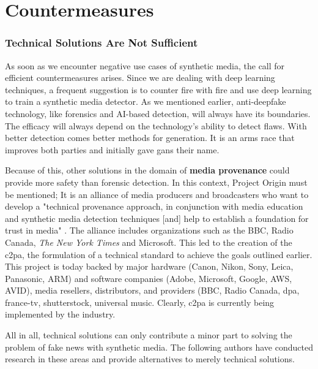 \documentclass[
  a4paper,  %
  twoside,  %
  bibliography=totoc,
  headsepline,
  cleardoublepage=empty,
  parskip=half,
  draft=false
]{scrbook}
\begin{document}
\section{Countermeasures}
\label{sec:rel-work-counteringdf}
\subsubsection*{Technical Solutions Are Not Sufficient}
As soon as we encounter negative use cases of synthetic media, the call for efficient countermeasures arises. Since we are dealing with deep learning techniques, a frequent suggestion is to counter fire with fire and use deep learning to train a synthetic media detector. As we mentioned earlier, anti-deepfake technology, like forensics and AI-based detection, will always have its boundaries. The efficacy will always depend on the technology's ability to detect flaws. With better detection comes better methods for generation. It is an arms race that improves both parties and initially gave \gls{gan}s their name.

Because of this, other solutions in the domain of \textbf{media provenance} could provide more safety than forensic detection. In this context, Project Origin must be mentioned; It is an alliance of media producers and broadcasters who want to develop a "technical provenance approach, in conjunction with media education and synthetic media detection techniques [and] help to establish a foundation for trust in media" \cite{ProjectOrigin}. The alliance includes organizations such as the BBC, Radio Canada, \textit{The New York Times} and Microsoft. This led to the creation of the \gls{c2pa}, the formulation of a technical standard to achieve the goals outlined earlier. This project is today backed by major hardware (Canon, Nikon, Sony, Leica, Panasonic, ARM) and software companies (Adobe, Microsoft, Google, AWS, AVID), media resellers, distributors, and providers (BBC, Radio Canada, dpa, france-tv, shutterstock, universal music. Clearly, \gls{c2pa} is currently being implemented by the industry.

All in all, technical solutions can only contribute a minor part to solving the problem of fake news with synthetic media. The following authors have conducted research in these areas and provide alternatives to merely technical solutions. 
\end{document}
